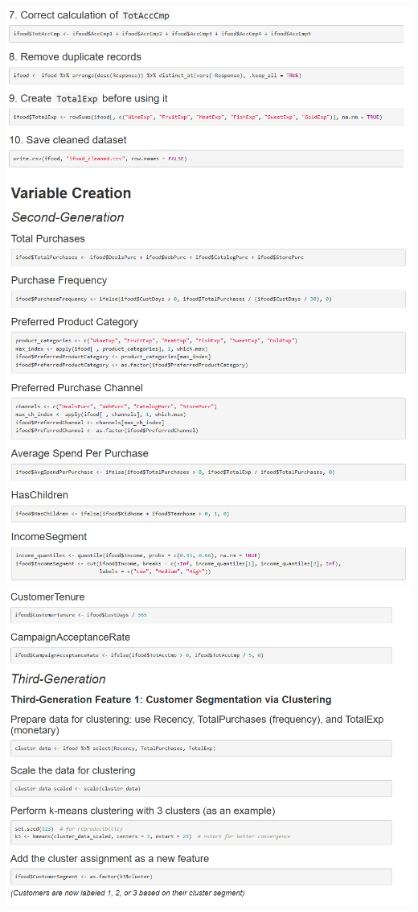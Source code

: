 \documentclass[12pt,a4paper]{article}
\begin{document}
\centering
\includegraphics[width=\textwidth]{Imatges/pre3.png}
\centering
\includegraphics[width=\textwidth]{Imatges/pre4.png}
\centering
\includegraphics[width=\textwidth]{Imatges/pre5.png}
\end{document}
